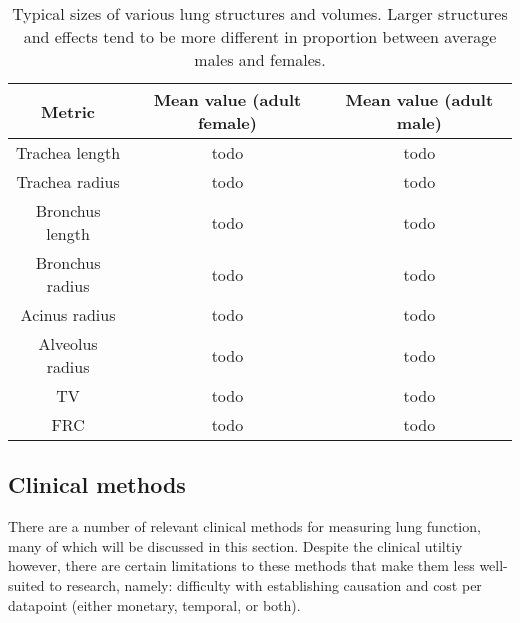 

\begin{table}[h]
\centering
    \begin{tabular}{ |c|c|c| }
    \hline
        Metric & Mean value (adult female) & Mean value (adult male) \\
        \hline \hline
        Trachea length & todo & todo \\ %
        Trachea radius & todo & todo \\
        Bronchus length & todo & todo \\
        Bronchus radius & todo & todo \\
        Acinus radius & todo & todo \\
        Alveolus radius & todo & todo \\
        \hline
        TV & todo & todo \\
        FRC & todo & todo \\
        \hline
\end{tabular}
\caption{
    Typical sizes of various lung structures and volumes. Larger structures and effects tend to be
    more different in proportion between average males and females.
}
\label{tab:lung-sizes}
\end{table}

\subsection{Clinical methods}

There are a number of relevant clinical methods for measuring lung function, many of which will be
discussed in this section. Despite the clinical utiltiy however, there are certain limitations to
these methods that make them less well-suited to research, namely: difficulty with establishing
causation and cost per datapoint (either monetary, temporal, or both).

